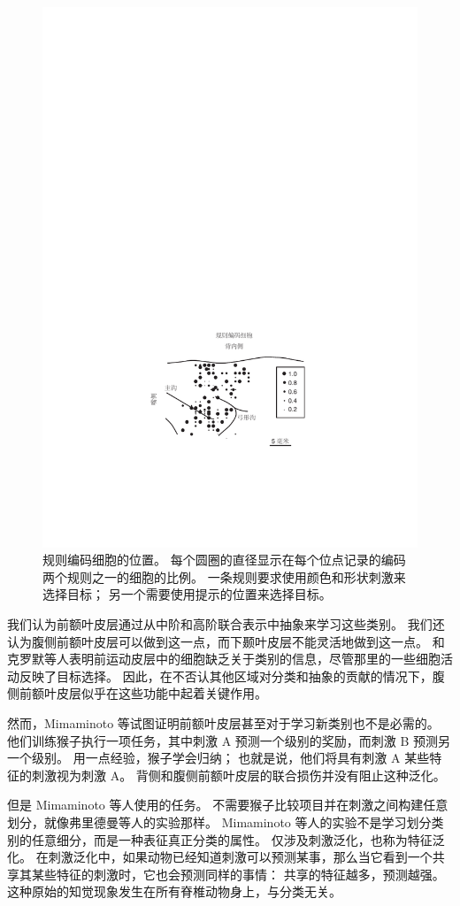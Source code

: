 \begin{figure}
	\centering
	\includegraphics[width=0.6\linewidth]{chap7/7_8}
	\caption{规则编码细胞的位置。
		每个圆圈的直径显示在每个位点记录的编码两个规则之一的细胞的比例。
		一条规则要求使用颜色和形状刺激来选择目标； 另一个需要使用提示的位置来选择目标\cite{white1999rule}。 \label{fig:7_8}}
\end{figure}
\par


我们认为前额叶皮层通过从中阶和高阶联合表示中抽象来学习这些类别。 
我们还认为腹侧前额叶皮层可以做到这一点，而下颞叶皮层不能灵活地做到这一点。
和克罗默等人\cite{cromer2011comparison}表明前运动皮层中的细胞缺乏关于类别的信息，尽管那里的一些细胞活动反映了目标选择。 
因此，在不否认其他区域对分类和抽象的贡献的情况下，腹侧前额叶皮层似乎在这些功能中起着关键作用。
\par


然而，Mimaminoto 等\cite{monti2010willful}试图证明前额叶皮层甚至对于学习新类别也不是必需的。
他们训练猴子执行一项任务，其中刺激 A 预测一个级别的奖励，而刺激 B 预测另一个级别。 
用一点经验，猴子学会归纳； 也就是说，他们将具有刺激 A 某些特征的刺激视为刺激 A。
背侧和腹侧前额叶皮层的联合损伤并没有阻止这种泛化。
\par


但是 Mimaminoto 等人使用的任务。
不需要猴子比较项目并在刺激之间构建任意划分，就像弗里德曼等人的实验那样。
Mimaminoto 等人的实验不是学习划分类别的任意细分，而是一种表征真正分类的属性。 
仅涉及刺激泛化，也称为特征泛化\cite{buckley2010top}。 
在刺激泛化中，如果动物已经知道刺激可以预测某事，那么当它看到一个共享其某些特征的刺激时，它也会预测同样的事情：
共享的特征越多，预测越强。
这种原始的知觉现象发生在所有脊椎动物身上，与分类无关。
\par


